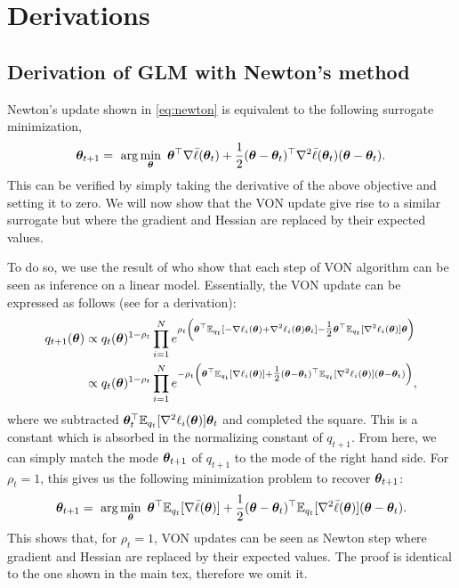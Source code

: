 \section{Derivations}

\subsection{Derivation of GLM with Newton's method}
\label{app:glm_newton}
Newton's update shown in \cref{eq:newton} is equivalent to the following surrogate minimization,
 \begin{equation}
       \boldsymbol{\theta}_{t+1} = \,\, \arg\min_{\boldsymbol{\theta}} \,\,  \boldsymbol{\theta}^\top \nabla \bar{\ell}(\boldsymbol{\theta}_t) + \frac{1}{2} (\boldsymbol{\theta}-\boldsymbol{\theta}_t)^\top \nabla^2 \bar{\ell}(\boldsymbol{\theta}_t) (\boldsymbol{\theta}-\boldsymbol{\theta}_t) .
\label{eq:newton_surrogate}
\end{equation}
This can be verified by simply taking the derivative of the above objective and setting it to zero. We will now show that the VON update give rise to a similar surrogate but where the gradient and Hessian are replaced by their expected values. 

To do so, we use the result of \citet{khan2019approximate} who show that each step of VON algorithm can be seen as inference on a linear model. Essentially, the VON update can be expressed as follows (see \citet[App. C.3]{nickl2024memory} for a derivation):
 \begin{equation}
    \begin{split}
       q_{t+1}(\boldsymbol{\theta}) &\propto q_t(\boldsymbol{\theta})^{1-\rho_t} \prod_{i=1}^N e^{ \rho_t \left( \boldsymbol{\theta}^\top \mathbb{E}_{q_t}[-\nabla \ell_i(\boldsymbol{\theta}) + \nabla^2 \ell_i(\boldsymbol{\theta}) \boldsymbol{\theta}_t] -\mbox{$\frac{1}{2}$} \boldsymbol{\theta}^\top \mathbb{E}_{q_t}[\nabla^2 \ell_i(\boldsymbol{\theta})] \boldsymbol{\theta}\right) } \\
       &\propto q_t(\boldsymbol{\theta})^{1-\rho_t} \prod_{i=1}^N e^{ -\rho_t \left( \boldsymbol{\theta}^\top \mathbb{E}_{q_t}[\nabla \ell_i(\boldsymbol{\theta})] + \mbox{$\frac{1}{2}$} (\boldsymbol{\theta} - \boldsymbol{\theta}_t)^\top \mathbb{E}_{q_t}[\nabla^2 \ell_i(\boldsymbol{\theta})] (\boldsymbol{\theta}-\boldsymbol{\theta}_t)\right) }, 
    \end{split}
    \label{eq:blr_sgd}
 \end{equation}
 where we subtracted $\boldsymbol{\theta}_t^\top \mathbb{E}_{q_t}[\nabla^2 \ell_i(\boldsymbol{\theta})] \boldsymbol{\theta}_t$ and completed the square. This is a constant which is absorbed in the normalizing constant of $q_{t+1}$. From here, we can simply match the mode $\boldsymbol{\theta}_{t+1}$ of $q_{t+1}$ to the mode of the right hand side. For $\rho_t = 1$, this gives us the following minimization problem to recover $\boldsymbol{\theta}_{t+1}$:
\begin{equation}
   \boldsymbol{\theta}_{t+1} = \,\, \arg\min_{\boldsymbol{\theta}} \,\,  \boldsymbol{\theta}^\top \mathbb{E}_{q_t}[\nabla \bar{\ell}(\boldsymbol{\theta})] + \frac{1}{2} (\boldsymbol{\theta}-\boldsymbol{\theta}_t)^\top \mathbb{E}_{q_t}[\nabla^2 \bar{\ell}(\boldsymbol{\theta})] (\boldsymbol{\theta}-\boldsymbol{\theta}_t).
\end{equation}
This shows that, for $\rho_t =1$, VON updates can be seen as Newton step where gradient and Hessian are replaced by their expected values. The proof is identical to the one shown in the main tex, therefore we omit it.

